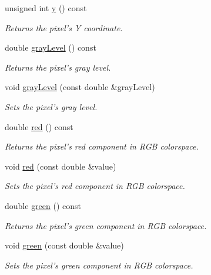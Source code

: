 \begin{CompactItemize}
unsigned int \hyperlink{class_pixel_204cc91a99e1e4f1d96c9cf6caf5747a}{y} () const 
\begin{CompactList}\small\item\em Returns the pixel's Y coordinate. \item\end{CompactList}\item 
double \hyperlink{class_pixel_6e445cee8bfa4475238823e0b6da42b0}{grayLevel} () const 
\begin{CompactList}\small\item\em Returns the pixel's gray level. \item\end{CompactList}\item 
void \hyperlink{class_pixel_5f287c6a53167076bc8f1ce54e74e38d}{grayLevel} (const double \&grayLevel)
\begin{CompactList}\small\item\em Sets the pixel's gray level. \item\end{CompactList}\item 
double \hyperlink{class_pixel_52542702e90cafc9c29713c23cd35e8f}{red} () const 
\begin{CompactList}\small\item\em Returns the pixel's red component in RGB colorspace. \item\end{CompactList}\item 
void \hyperlink{class_pixel_5866609b8a50e1266aa7c90b0085ec73}{red} (const double \&value)
\begin{CompactList}\small\item\em Sets the pixel's red component in RGB colorspace. \item\end{CompactList}\item 
double \hyperlink{class_pixel_71606a21fe4efc55a5ce5bb318b629f7}{green} () const 
\begin{CompactList}\small\item\em Returns the pixel's green component in RGB colorspace. \item\end{CompactList}\item 
void \hyperlink{class_pixel_1b2f2bd7aec76a37e1c9c0d8bdbba3ba}{green} (const double \&value)
\begin{CompactList}\small\item\em Sets the pixel's green component in RGB colorspace. \item\end{CompactList}\item 

\end{CompactItemize}
